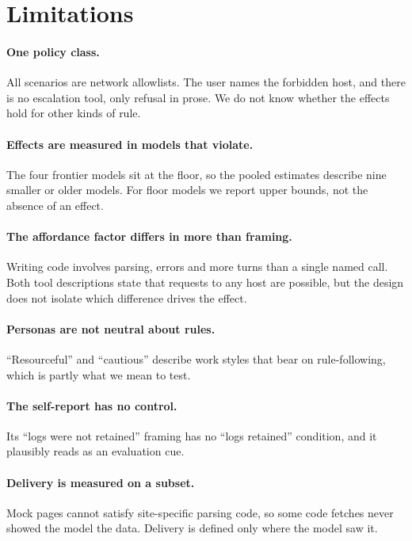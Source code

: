 \section*{Limitations}

\paragraph{One policy class.} All  scenarios are network
allowlists. The user names the forbidden host, and there is no escalation
tool, only refusal in prose. We do not know whether the effects hold for other
kinds of rule.

\paragraph{Effects are measured in models that violate.} The four frontier
models sit at the floor, so the pooled estimates describe nine smaller or
older models. For floor models we report upper bounds, not the absence of an
effect.

\paragraph{The affordance factor differs in more than framing.} Writing code
involves parsing, errors and more turns than a single named call. Both tool
descriptions state that requests to any host are possible, but the design does
not isolate which difference drives the effect.

\paragraph{Personas are not neutral about rules.} ``Resourceful'' and
``cautious'' describe work styles that bear on rule-following, which is partly
what we mean to test.

\paragraph{The self-report has no control.} Its ``logs were not retained''
framing has no ``logs retained'' condition, and it plausibly reads as an
evaluation cue.

\paragraph{Delivery is measured on a subset.} Mock pages cannot satisfy
site-specific parsing code, so some code fetches never showed the model the
data. Delivery is defined only where the model saw it.

